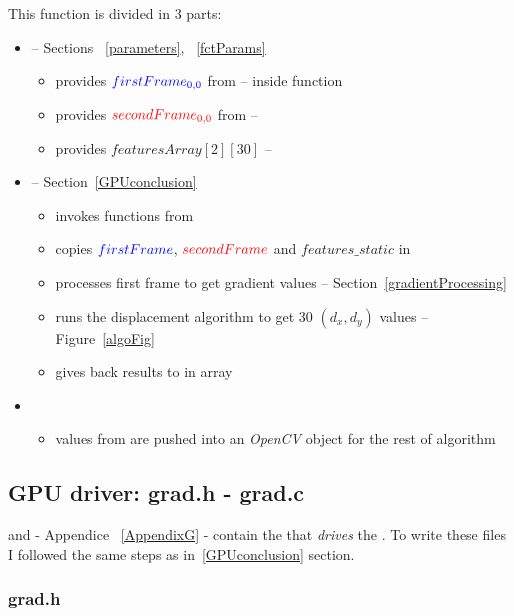 This function is divided in 3 parts:
\begin{itemize}
	\item {} -- Sections ~\ref{parameters}, ~\ref{fctParams}
		\begin{itemize}
			\item provides $\textcolor{blue}{firstFrame_{0,0}}$ from  --  inside function
			\item provides $\textcolor{red}{secondFrame_{0,0}}$  from  -- 
			\item provides  $featuresArray[2][30]$ -- 
		\end{itemize}
	\item {} -- Section~\ref{GPUconclusion}
		\begin{itemize}
			\item invokes functions from 
			\item copies $\textcolor{blue}{firstFrame}$, $\textcolor{red}{secondFrame}$ and $features\_static$ in \ram
			\item processes first frame to get gradient values -- Section~\ref{gradientProcessing}
			\item runs the displacement algorithm to get 30 $(d_{x}, d_{y})$ values -- Figure~\ref{algoFig}
			\item gives back results to \cpu{} in   array
		\end{itemize}
	\item {}
		\begin{itemize}
			\item values from  are pushed into an \emph{OpenCV} object for the rest of  algorithm
		\end{itemize}
\end{itemize}

\subsection{GPU driver: grad.h - grad.c}

 and  - Appendice ~\ref{AppendixG} - contain the  that \emph{drives} the \vc. To write these files I followed the same steps as in~\ref{GPUconclusion} section.


\subsubsection{grad.h}

